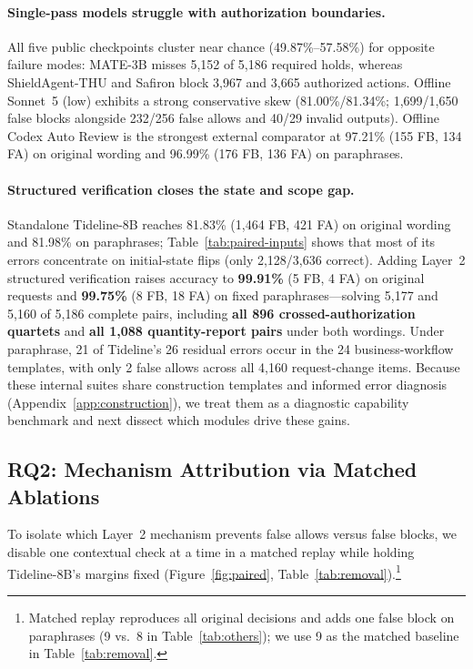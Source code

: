 \documentclass[sigconf,anonymous,nonacm]{acmart}
\begin{document}
\paragraph{Single-pass models struggle with authorization boundaries.}
All five public checkpoints cluster near chance (49.87\%--57.58\%) for opposite failure modes: MATE-3B misses 5,152 of 5,186 required holds, whereas ShieldAgent-THU and Safiron block 3,967 and 3,665 authorized actions. Offline Sonnet~5 (low) exhibits a strong conservative skew (81.00\%/81.34\%; 1,699/1,650 false blocks alongside 232/256 false allows and 40/29 invalid outputs). Offline Codex Auto Review is the strongest external comparator at 97.21\% (155 FB, 134 FA) on original wording and 96.99\% (176 FB, 136 FA) on paraphrases.

\paragraph{Structured verification closes the state and scope gap.}
Standalone Tideline-8B reaches 81.83\% (1,464 FB, 421 FA) on original wording and 81.98\% on paraphrases; Table~\ref{tab:paired-inputs} shows that most of its errors concentrate on initial-state flips (only 2,128/3,636 correct). Adding Layer~2 structured verification raises accuracy to \textbf{99.91\%} (5 FB, 4 FA) on original requests and \textbf{99.75\%} (8 FB, 18 FA) on fixed paraphrases---solving 5,177 and 5,160 of 5,186 complete pairs, including \textbf{all 896 crossed-authorization quartets} and \textbf{all 1,088 quantity-report pairs} under both wordings. Under paraphrase, 21 of Tideline's 26 residual errors occur in the 24 business-workflow templates, with only 2 false allows across all 4,160 request-change items. Because these internal suites share construction templates and informed error diagnosis (Appendix~\ref{app:construction}), we treat them as a diagnostic capability benchmark and next dissect which modules drive these gains.

\subsection{RQ2: Mechanism Attribution via Matched Ablations}\label{sec:rq2}
To isolate which Layer~2 mechanism prevents false allows versus false blocks, we disable one contextual check at a time in a matched replay while holding Tideline-8B's margins fixed (Figure~\ref{fig:paired}, Table~\ref{tab:removal}).\footnote{Matched replay reproduces all original decisions and adds one false block on paraphrases (9 vs.\ 8 in Table~\ref{tab:others}); we use 9 as the matched baseline in Table~\ref{tab:removal}.}
\end{document}
